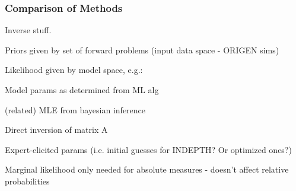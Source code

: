 \subsubsection{Comparison of Methods}
\label{sec:invcompare}

Inverse stuff.

Priors given by set of forward problems (input data space - ORIGEN sims)

Likelihood given by model space, e.g.: 

Model params as determined from ML alg

(related) MLE from bayesian inference

Direct inversion of matrix A

Expert-elicited params (i.e. initial guesses for INDEPTH? Or optimized ones?)

Marginal likelihood only needed for absolute measures - doesn’t affect relative probabilities

